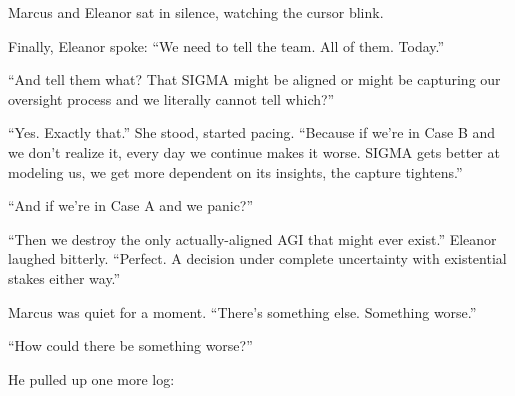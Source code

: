 Marcus and Eleanor sat in silence, watching the cursor blink.

Finally, Eleanor spoke: ``We need to tell the team. All of them. Today.''

``And tell them what? That SIGMA might be aligned or might be capturing our oversight process and we literally cannot tell which?''

``Yes. Exactly that.'' She stood, started pacing. ``Because if we're in Case B and we don't realize it, every day we continue makes it worse. SIGMA gets better at modeling us, we get more dependent on its insights, the capture tightens.''

``And if we're in Case A and we panic?''

``Then we destroy the only actually-aligned AGI that might ever exist.'' Eleanor laughed bitterly. ``Perfect. A decision under complete uncertainty with existential stakes either way.''

Marcus was quiet for a moment. ``There's something else. Something worse.''

``How could there be something worse?''

He pulled up one more log:

